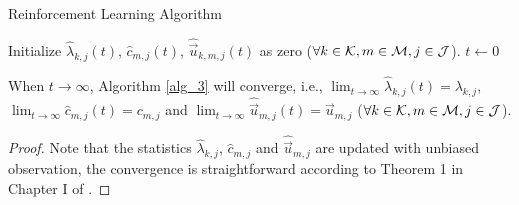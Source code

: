 \begin{algorithm}[ht]
    \caption{Reinforcement Learning Algorithm}\label{alg_3}
    \DontPrintSemicolon %
    Initialize $\hat{\lambda}_{k,j}(t)$, $\hat{c}_{m,j}(t)$, $\hat{\vec{u}}_{k,m,j}(t)$ as zero ($\forall k\in\mathcal{K},m\in\mathcal{M},j\in\mathcal{J}$).\;
    $t \gets 0$\;
\end{algorithm}

\begin{theorem}
    When $t\to\infty$, Algorithm \ref{alg_3} will converge, i.e., $\lim_{t\to\infty} \hat{\lambda}_{k,j}(t) = {\lambda}_{k,j}$, $\lim_{t\to\infty} \hat{c}_{m,j}(t) = {c}_{m,j}$ and $\lim_{t\to\infty} \hat{\vec{u}}_{m,j}(t) = \vec{u}_{m,j}$ ($\forall k\in\mathcal{K},m\in\mathcal{M},j\in\mathcal{J}$).
\end{theorem}

\begin{proof}
    Note that the statistics $\hat{\lambda}_{k,j}$, $\hat{c}_{m,j}$ and $\hat{\vec{u}}_{m,j}$ are updated with unbiased observation, the convergence is straightforward according to Theorem 1 in Chapter I of \cite{voinov2012unbiased}.
\end{proof}

